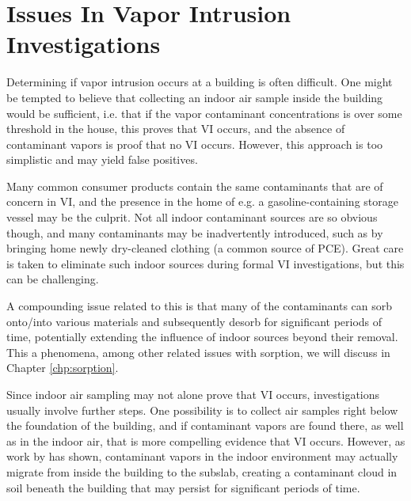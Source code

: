 \section{Issues In Vapor Intrusion Investigations}

Determining if vapor intrusion occurs at a building is often difficult.
One might be tempted to believe that collecting an indoor air sample inside the building would be sufficient, i.e. that if the vapor contaminant concentrations is over some threshold in the house, this proves that VI occurs, and the absence of contaminant vapors is proof that no VI occurs.
However, this approach is too simplistic and may yield false positives.\par

Many common consumer products contain the same contaminants that are of concern in VI, and the presence in the home of e.g. a gasoline-containing storage vessel may be the culprit.
Not all indoor contaminant sources are so obvious though, and many contaminants may be inadvertently introduced, such as by bringing home newly dry-cleaned clothing (a common source of PCE).
Great care is taken to eliminate such indoor sources during formal VI investigations, but this can be challenging\cite{u.s._environmental_protection_agency_oswer_2015}.

A compounding issue related to this is that many of the contaminants can sorb onto/into various materials and subsequently desorb for significant periods of time, potentially extending the influence of indoor sources beyond their removal\cite{meininghaus_diffusion_2000,meininghaus_diffusion_2002}.
This a phenomena, among other related issues with sorption, we will discuss in Chapter \ref{chp:sorption}.\par

Since indoor air sampling may not alone prove that VI occurs, investigations usually involve further steps.
One possibility is to collect air samples right below the foundation of the building, and if contaminant vapors are found there, as well as in the indoor air, that is more compelling evidence that VI occurs.
However, as work by \citeauthor{holton_creation_2018}\cite{holton_creation_2018} has shown, contaminant vapors in the indoor environment may actually migrate from inside the building to the subslab, creating a contaminant cloud in soil beneath the building that may persist for significant periods of time.\par

